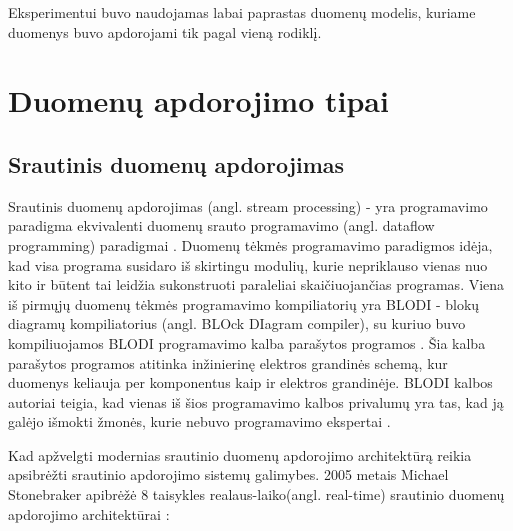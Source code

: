 \documentclass{VUMIFPSkursinis}
\begin{document}
Eksperimentui buvo naudojamas labai paprastas duomenų modelis, kuriame duomenys buvo apdorojami tik pagal vieną rodiklį.

\section{Duomenų apdorojimo tipai}

\subsection{Srautinis duomenų apdorojimas} \label{strprocess}

    Srautinis duomenų apdorojimas (angl. stream processing) - yra programavimo paradigma ekvivalenti duomenų srauto programavimo (angl. dataflow programming) paradigmai \cite{shortstreamproc}. 
Duomenų tėkmės programavimo paradigmos idėja, kad visa programa susidaro iš skirtingu modulių, kurie nepriklauso vienas nuo kito ir būtent tai leidžia sukonstruoti paraleliai skaičiuojančias programas. 
Viena iš pirmųjų duomenų tėkmės programavimo kompiliatorių yra BLODI - blokų diagramų kompiliatorius (angl. BLOck DIagram compiler), su kuriuo buvo kompiliuojamos 
BLODI programavimo kalba parašytos programos \cite{kelly1961block}.  Šia kalba parašytos programos atitinka inžinierinę elektros grandinės schemą, 
kur duomenys keliauja per komponentus kaip ir elektros grandinėje. BLODI kalbos autoriai teigia, kad vienas iš šios programavimo kalbos privalumų yra tas, 
kad ją galėjo išmokti žmonės, kurie nebuvo programavimo ekspertai .\par
Kad apžvelgti modernias srautinio duomenų apdorojimo architektūrą reikia apsibrėžti srautinio apdorojimo sistemų galimybes.
2005 metais Michael Stonebraker apibrėžė 8 taisykles realaus-laiko(angl. real-time) srautinio duomenų apdorojimo architektūrai \cite{stonebraker20058}:
\end{document}
